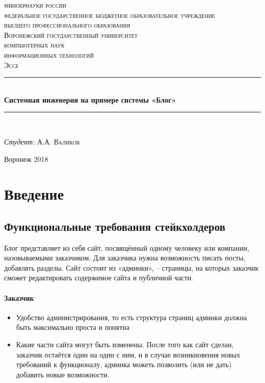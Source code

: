 \documentclass[bibliography=totocnumbered]{scrartcl}
\begin{document}
\begin{titlepage}
\newcommand{\HRule}{\rule{\linewidth}{0.5mm}}
\center
\textsc {
\footnotesize{
минобрнауки россии\\
федеральное государственное бюджетное образовательное учреждение\\
высшего профессионального образования}\\
\large{Воронежский государственный университет}
}\\[1.0cm]
\textsc{ компьютерных наук}\\
\textsc{ информационных технологий}\\[1.0cm] 
\textsc{\Large Эссе}\\[0.5cm]
\HRule \\[0.4cm]
{ \huge \bfseries Системная инженерия на примере системы «Блог»}\\[0.4cm] %
\HRule \\[1.5cm]


\begin{flushleft} \large
\emph{Студент:} А.А. \textsc{Валиков} \\
\end{flushleft}

\vfill
\begin{center}
Воронеж 2018
\end{center}
\end{titlepage}

\tableofcontents

\newpage

\section{Введение}

\subsection{Функциональные требования стейкхолдеров}
Блог представляет из себя сайт, посвящённый одному человеку или компании, назовываемыми заказчиком. Для заказчика нужна возможность писать посты, добавлять разделы. Сайт состоит из «админки», -- страницы, на которых заказчик сможет редактировать содержимое сайта и публичиой части.

\paragraph{Заказчик}
\begin{itemize}
    \item Удобство администрирования, то есть структура страниц админки должна быть максимально проста и понятна
    \item Какие части сайта могут быть изменены. После того как сайт сделан, заказчик остаётся один на один с ним, и в случае возникновения новых требований к функционалу, админка можеть позволить (или не дать) добавить новые возможности.
\end{itemize}
\end{document}
